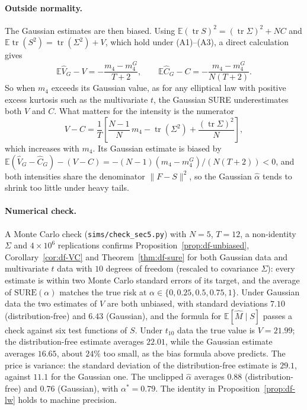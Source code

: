 \paragraph{Outside normality.}
The Gaussian estimates are then biased. Using $\mathbb{E}(\operatorname{tr}S)^2 = (\operatorname{tr}\Sigma)^2 + NC$ and $\mathbb{E}\operatorname{tr}(S^2) = \operatorname{tr}(\Sigma^2) + V$, which hold under (A1)--(A3), a direct calculation gives
\[
  \mathbb{E}\hat V_G - V = -\frac{m_4 - m_4^G}{T + 2}, \qquad
  \mathbb{E}\hat C_G - C = -\frac{m_4 - m_4^G}{N(T + 2)}.
\]
So when $m_4$ exceeds its Gaussian value, as for any elliptical law with positive excess kurtosis such as the multivariate $t$, the Gaussian SURE underestimates both $V$ and $C$. What matters for the intensity is the numerator
\[
  V - C = \frac{1}{T}\left[\frac{N-1}{N}\,m_4 - \operatorname{tr}(\Sigma^2) + \frac{(\operatorname{tr}\Sigma)^2}{N}\right],
\]
which increases with $m_4$. Its Gaussian estimate is biased by $\mathbb{E}(\hat V_G - \hat C_G) - (V - C) = -(N-1)(m_4 - m_4^G)/(N(T+2)) < 0$, and both intensities share the denominator $\|F - S\|^2$, so the Gaussian $\hat\alpha$ tends to shrink too little under heavy tails.

\paragraph{Numerical check.}
A Monte Carlo check (\texttt{sims/check\_sec5.py}) with $N = 5$, $T = 12$, a non-identity $\Sigma$ and $4\times10^6$ replications confirms Proposition~\ref{prop:df-unbiased}, Corollary~\ref{cor:df-VC} and Theorem~\ref{thm:df-sure} for both Gaussian data and multivariate $t$ data with $10$ degrees of freedom (rescaled to covariance $\Sigma$): every estimate is within two Monte Carlo standard errors of its target, and the average of $\mathrm{SURE}(\alpha)$ matches the true risk at $\alpha \in \{0, 0.25, 0.5, 0.75, 1\}$. Under Gaussian data the two estimates of $V$ are both unbiased, with standard deviations $7.10$ (distribution-free) and $6.43$ (Gaussian), and the formula for $\mathbb{E}[\hat M \mid S]$ passes a check against six test functions of $S$. Under $t_{10}$ data the true value is $V = 21.99$; the distribution-free estimate averages $22.01$, while the Gaussian estimate averages $16.65$, about $24\%$ too small, as the bias formula above predicts. The price is variance: the standard deviation of the distribution-free estimate is $29.1$, against $11.1$ for the Gaussian one. The unclipped $\hat\alpha$ averages $0.88$ (distribution-free) and $0.76$ (Gaussian), with $\alpha^* = 0.79$. The identity in Proposition~\ref{prop:df-lw} holds to machine precision.
